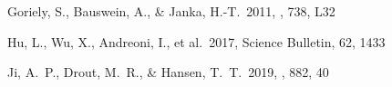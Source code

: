 \documentclass[twocolumn,twocolappendix]{aastex63}
\begin{document}
\begin{thebibliography}{}




 Goriely, S., Bauswein, A., \& Janka, H.-T.\ 2011, \apjl, 738, L32


















 Hu, L., Wu, X., Andreoni, I., et al.\ 2017, Science Bulletin, 62, 1433






 Ji, A.~P., Drout, M.~R., \& Hansen, T.~T.\ 2019, \apj, 882, 40



\end{thebibliography}
\end{document}
